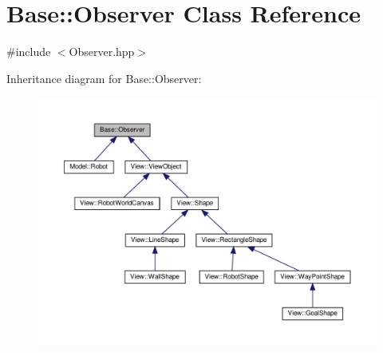 \hypertarget{class_base_1_1_observer}{}\section{Base\+:\+:Observer Class Reference}
\label{class_base_1_1_observer}


{\ttfamily \#include $<$Observer.\+hpp$>$}



Inheritance diagram for Base\+:\+:Observer\+:
\nopagebreak
\begin{figure}[H]
\begin{center}
\leavevmode
\includegraphics[width=350pt]{class_base_1_1_observer__inherit__graph}
\end{center}
\end{figure}
